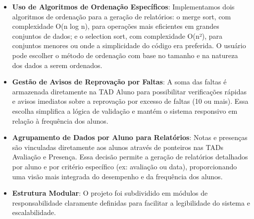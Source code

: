 \documentclass{article}
\begin{document}
\begin{itemize}
    \item \textbf{Uso de Algoritmos de Ordenação Específicos}: Implementamos dois algoritmos de ordenação para a geração de relatórios: o merge sort, com complexidade O(n log n), para operações mais eficientes em grandes conjuntos de dados; e o selection sort, com complexidade O(n²), para conjuntos menores ou onde a simplicidade do código era preferida. O usuário pode escolher o método de ordenação com base no tamanho e na natureza dos dados a serem ordenados.
    
    \item \textbf{Gestão de Avisos de Reprovação por Faltas}: A soma das faltas é armazenada diretamente na TAD Aluno para possibilitar verificações rápidas e avisos imediatos sobre a reprovação por excesso de faltas (10 ou mais). Essa escolha simplifica a lógica de validação e mantém o sistema responsivo em relação à frequência dos alunos.
    
    \item \textbf{Agrupamento de Dados por Aluno para Relatórios}: Notas e presenças são vinculadas diretamente aos alunos através de ponteiros nas TADs Avaliação e Presença. Essa decisão permite a geração de relatórios detalhados por aluno e por critério específico (ex: avaliação ou data), proporcionando uma visão mais integrada do desempenho e da frequência dos alunos.

    \item \textbf{Estrutura Modular}: O projeto foi subdividido em módulos de responsabilidade claramente definidas para facilitar a legibilidade do sistema e escalabilidade.

\end{itemize}
\end{document}
